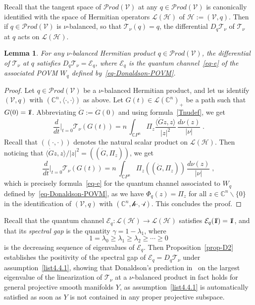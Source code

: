 \documentclass[11pt]{article}
\newtheorem{lemm}[theo]{Lemma}
\theoremstyle{definition}
\numberwithin{equation}{section}
\numberwithin{figure}{section}
\numberwithin{table}{section}
\let\cal\mathscr
\newcommand{\CCC}{{\mathbb{C}}}
\newcommand{\cE}{{\mathcal{E}}}
\newcommand{\cH}{{\mathcal{H}}}
\newcommand{\cV}{{\mathcal{V}}}
\newcommand*\id{{1\hskip-2.5pt{\rm l}}}
\renewcommand\geq {\geqslant}
\newcommand\< {\mathcal{h}}
\renewcommand\> {\mathcal{i}}
\newcommand\TT {{\cal T}}
\newcommand*\cL{\mathscr{L}}
\newcommand{\Prod}{{\mathcal Prod}}
\begin{document}
Recall that the tangent space of $\Prod(\cV)$ at any $q\in\Prod(\cV)$ is canonically identified with the space of Hermitian operators $\cL(\cH)$ of $\cH:=(\cV,q)$. Then if $q\in\Prod(\cV)$ is $\nu$-balanced, so that $\TT_\nu(q)=q$, the differential $D_q\TT_\nu$ of $\TT_\nu$ at $q$ acts on $\cL(\cH)$.

\begin{lemm}\label{prop-D1}
For any
$\nu$-balanced Hermitian product $q\in\Prod(\cV)$, the differential of $\TT_\nu$ at $q$ satisfies $D_q\TT_\nu = \cE_q$, where $\cE_q$ is the quantum channel~\eqref{eq-e} of the associated POVM $W_q$ defined by~\eqref{eq-Donaldson-POVM}.
\end{lemm}

\begin{proof}
Let $q\in\Prod(\cV)$ be a $\nu$-balanced Hermitian product, and let us identify $(\cV,q)$ with $(\CCC^n,\langle\cdot,\cdot\rangle)$ as above. Let $G(t) \in \cL(\CCC^n)_+$ be a path such that $G(0)=\id$. Abbreviating $\dot{G}:=\dot{G}(0)$ and using formula~\eqref{Tnudef}, we get
\[
\frac{d}{dt}\Big |_{t=0} \TT_\nu(G(t)) = n\,\int_{\CCC P^n} \Pi_z \frac{\langle\dot{G}z,z\rangle}{|z|^2}\,\frac{d\nu(z)}{|\nu|}\;.
\]
Recall that $((\cdot,\cdot))$ denotes the natural scalar product on $\cL(\cH)$. Then noticing that $\langle\dot{G}z,z\rangle/|z|^2= ((\dot{G},\Pi_z))$, we get
\[
\frac{d}{dt}\Big |_{t=0} \TT_\nu(G(t)) =
n \ \int_{\CCC P^n} \Pi_z ((\dot{G},\Pi_z))
\,\frac {d\nu(z)}{|\nu|}\;,
\]
which is precisely formula~\eqref{eq-e} for the quantum channel associated to $W_q$ defined by~\eqref{eq-Donaldson-POVM}, as we have $\Phi_q(z)=\Pi_z$ for all $z\in\CCC^n\backslash\{0\}$ in the identification of $(\cV,q)$ with $(\CCC^n,\<\cdot,\cdot\>)$. This concludes the proof.
\end{proof}


Recall that the quantum channel $\cE_q:\cL(\cH)\to\cL(\cH)$ satisfies $\cE_q(\id)=\id$, and that its \emph{spectral gap} is the quantity $\gamma=1-\lambda_1$, where
\begin{equation}
1=\lambda_0\geq\lambda_1\geq\lambda_2\geq\cdots\geq 0
\end{equation}
is the decreasing sequence of eigenvalues of $\cE_q$. Then Proposition~\ref{prop-D2} establishes the positivity of the spectral gap of $\cE_q=D_q\TT_\nu$ under assumption~\eqref{list4.4.1}, showing that Donaldson's prediction in~\cite[Section~4.1]{D} on the largest eigenvalue of the linearization of $\TT_\nu$ at a $\nu$-balanced product in fact holds for general projective smooth manifolds $Y$, as assumption~\eqref{list4.4.1} is automatically satisfied as soon as $Y$ is not contained in any proper projective subspace.
\end{document}

